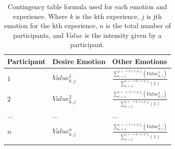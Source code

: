 \begin{table}
\caption{Contingency table formula used for each emotion and experience. Where $k$ is the kth experience, $j$ is jth emotion for the kth experience, $n$ is the total number of participants, and $Value$ is the intensity given by a participant.}
\label{table:table_contingency}
\small
\begin{tabular}{|l|l|l|}
\hline
Participant & Desire Emotion & Other Emotions \\
\hline
$1$ & $Value_{k,j}^{1}$  & $\frac{\sum_{i=1}^{i<=7 \wedge i \neq j}(Value_{k,i}^{1})}{\sum_{i=1}^{i<=6 \wedge i \neq j}(1)}$\\
\hline
$2$ & $Value_{k,j}^{2}$ & $\frac{\sum_{i=1}^{i<=7 \wedge i \neq j}(Value_{k,i}^{2})}{\sum_{i=1}^{i<=6 \wedge i \neq j}(1)}$\\
\hline
... & ... & ...\\
\hline
$n$ & $Value_{k,j}^{n}$ & $\frac{\sum_{i=1}^{i<=7 \wedge i \neq j}(Value_{k,i}^{2})}{\sum_{i=1}^{i<=6 \wedge i \neq j}(1)}$\\
\hline
\multicolumn{3}{c}{}
\end{tabular}
\end{table}